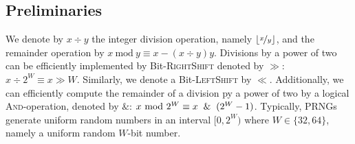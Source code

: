 \documentclass[a4paper, UKenglish, cleveref, autoref, thm-restate]{lipics-v2021}
\newcommand{\Mod}[1]{\ \mathrm{mod}\ #1}
\begin{document}
\iffalse
\begin{algorithm}[!htb] \label{alg:ba}
    \caption{Preferential-Attachment-Generator \cite{BASampling}: sample BA-graphs in linear time}
    \Require{source of uniformly-distributed random integers in $[0,i]$ for parameter $i$}
    \Require{inital edge-list $E_0$ with $n_0$ nodes and $m_0 \coloneqq |E_0|$ edges, number of additional nodes $N$, neighbor-parameter $\nu$}
    $M \leftarrow$ array of size $2\left(m_0 + \nu N\right)$\;
    \For{$i = 0,\ldots,m_0 - 1$}{
        $\left(M[2i], M[2i + 1]\right) \leftarrow E_0[i]$\;
    }
    \For{$i = 0,\ldots,N - 1$}{
        \For{$j = 1,\ldots,\nu$}{
            $k \leftarrow$ random integer in $[0,2(m_0 + i\nu) - 1]$\;
            $M[2(m_0 + i\nu)] \leftarrow M[k]$\;
            $M[2(m_0 + i\nu) + 1] \leftarrow n_0 + i$\;
        }
    }
    $E \leftarrow$ array (of edges) of size $\left(m_0 + \nu N\right)$\;
    \For{$i = 0,\ldots,m_0 + \nu N - 1$}{
        $E[i] \leftarrow (M[2i], M[2i + 1])$\;
    }
    \KwRet{$E$}\;
\end{algorithm}
\fi

\subsection{Preliminaries}\label{sec:1.2}
We denote by $x \div y$ the integer division operation, namely $\lfloor\nicefrac{x}{y}\rfloor$, and the remainder operation by $x \Mod y \equiv x - (x \div y)y$. 
Divisions by a power of two can be efficiently implemented by Bit-\textsc{RightShift} denoted by $\gg$: $x \div 2^W \equiv x \gg W$.
Similarly, we denote a Bit-\textsc{LeftShift} by $\ll$.
Additionally, we can efficiently compute the remainder of a division py a power of two by a logical \textsc{And}-operation, denoted by $\&$: $x \Mod 2^W \equiv x \And (2^W - 1)$.
Typically, PRNGs generate uniform random numbers in an interval $[0,2^W)$ where $W \in \{32,64\}$, namely a uniform random $W$-bit number.
\end{document}
